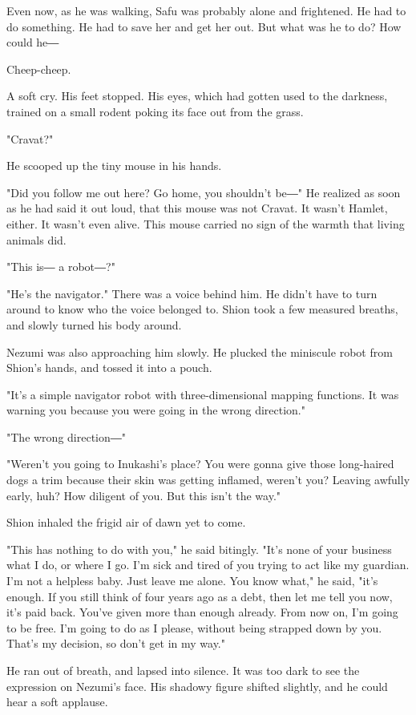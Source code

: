 Even now, as he was walking, Safu was probably alone and frightened. He
had to do something. He had to save her and get her out. But what was he
to do? How could he―

Cheep-cheep.

A soft cry. His feet stopped. His eyes, which had gotten used to the
darkness, trained on a small rodent poking its face out from the grass.

"Cravat?"

He scooped up the tiny mouse in his hands.

"Did you follow me out here? Go home, you shouldn't be―" He realized as
soon as he had said it out loud, that this mouse was not Cravat. It
wasn't Hamlet, either. It wasn't even alive. This mouse carried no sign
of the warmth that living animals did.

"This is― a robot―?"

"He's the navigator." There was a voice behind him. He didn't have to
turn around to know who the voice belonged to. Shion took a few measured
breaths, and slowly turned his body around.

Nezumi was also approaching him slowly. He plucked the miniscule robot
from Shion's hands, and tossed it into a pouch.

"It's a simple navigator robot with three-dimensional mapping functions.
It was warning you because you were going in the wrong direction."

"The wrong direction―"

"Weren't you going to Inukashi's place? You were gonna give those
long-haired dogs a trim because their skin was getting inflamed, weren't
you? Leaving awfully early, huh? How diligent of you. But this isn't the
way."

Shion inhaled the frigid air of dawn yet to come.

"This has nothing to do with you," he said bitingly. "It's none of your
business what I do, or where I go. I'm sick and tired of you trying to
act like my guardian. I'm not a helpless baby. Just leave me alone. You
know what," he said, "it's enough. If you still think of four years ago
as a debt, then let me tell you now, it's paid back. You've given more
than enough already. From now on, I'm going to be free. I'm going to do
as I please, without being strapped down by you. That's my decision, so
don't get in my way."

He ran out of breath, and lapsed into silence. It was too dark to see
the expression on Nezumi's face. His shadowy figure shifted slightly,
and he could hear a soft applause.


